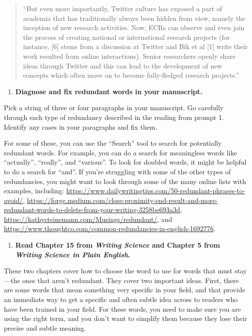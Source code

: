 \documentclass[]{tufte-book}
\providecommand{\tightlist}{%
  \setlength{\itemsep}{0pt}\setlength{\parskip}{0pt}}
\begin{document}
\begin{quote}
``But even more importantly, Twitter culture has exposed a part of academia
that has traditionally always been hidden from view, namely the inception of new
research activities. Now, ECRs can observe and even join the process of creating
national or international research projects (for instance, {[}6{]} stems from a
discussion at Twitter and Bik et al {[}1{]} write their work resulted from online
interactions). Senior researchers openly share ideas through Twitter and this
can lead to the development of new concepts which often move on to become
fully-fledged research projects.''
\end{quote}

\begin{enumerate}
\def\labelenumi{\arabic{enumi}.}
\setcounter{enumi}{2}
\tightlist
\item
  \textbf{Diagnose and fix redundant words in your manuscript.}
\end{enumerate}

Pick a string of three or four paragraphs in your manuscript. Go carefully through
each type of redundancy described in the reading from prompt 1. Identify any
cases in your paragraphs and fix them.

For some of these, you can use the ``Search'' tool to search for potentially redundant
words. For example, you can do a search for meaningless words like ``actually'',
``really'', and ``various''. To look for doubled words, it might be helpful to do a
search for ``and''. If you're struggling with some of the other types of redundancies,
you might want to look through some of the many online lists with examples,
including: \url{https://www.dailywritingtips.com/50-redundant-phrases-to-avoid/},
\url{https://forge.medium.com/close-proximity-end-result-and-more-redundant-words-to-delete-from-your-writing-3258be693a3d},
\url{https://kathysteinemann.com/Musings/redundant/}, and
\url{https://www.thoughtco.com/common-redundancies-in-english-1692776}.

\begin{enumerate}
\def\labelenumi{\arabic{enumi}.}
\setcounter{enumi}{3}
\tightlist
\item
  \textbf{Read Chapter 15 from \emph{Writing Science} and Chapter 5 from \emph{Writing Science in Plain English}.}
\end{enumerate}

These two chapters cover how to choose the word to use for words that must
stay---the ones that aren't redundant. They cover two important ideas. First,
there are some words that mean something very specific in your field, and that
provide an immediate way to get a specific and often subtle idea across to
readers who have been trained in your field. For these words, you need to make
sure you are using the right term, and you don't want to simplify them because
they lose their precise and subtle meaning.
\end{document}
